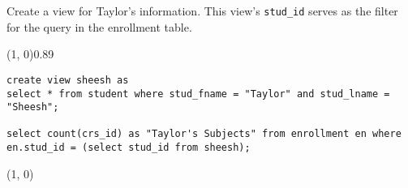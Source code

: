 
Create a view for Taylor's information. This view's \texttt{stud\_id} serves as the filter for the query in the enrollment table.
\vspace{\baselineskip}

\sol{}
\noindent\line(1, 0){0.89\linewidth}
\begin{verbatim}
create view sheesh as
select * from student where stud_fname = "Taylor" and stud_lname = "Sheesh";

select count(crs_id) as "Taylor's Subjects" from enrollment en where
en.stud_id = (select stud_id from sheesh);
\end{verbatim}
\noindent\line(1, 0){\linewidth}
